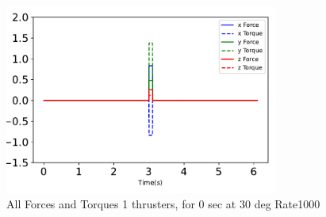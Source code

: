 \begin{figure}[htbp]\centerline{\includegraphics[width=0.8\textwidth]{AutoTeX/1Thrusters_0s_30deg_Loc2_Rate1000}}\caption{All Forces and Torques 1 thrusters, for 0 sec at 30 deg Rate1000}\label{fig:1Thrusters_0s_30deg_Loc2_Rate1000}\end{figure}